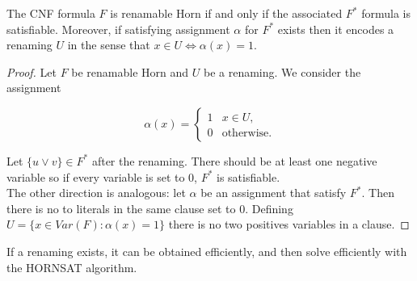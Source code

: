 \begin{theorem}
  The CNF formula $F$ is renamable Horn if and only if the associated $F^*$ formula is satisfiable. Moreover, if satisfying assignment $\alpha$ for $F^*$  exists then it encodes a renaming $U$ in the sense that $x \in U \iff \alpha(x) = 1$.
\end{theorem}
\begin{proof}
  Let $F$ be renamable Horn and $U$ be a renaming. We consider the assignment

$$
\alpha(x)= 
\begin{cases}
1 & x \in U,\\
0 & \text{otherwise}.
\end{cases}
$$
 
  Let $\{u\vee v\} \in F^*$ after the renaming. There should be at least one negative variable so if every variable is set to 0, $F^*$ is satisfiable.\\

  The other direction is analogous: let $\alpha$ be an assignment that satisfy $F^*$. Then there is no to literals in the same clause set to 0. Defining $U=  \{x \in Var(F) : \alpha(x) = 1\}$ there is no two positives variables in a clause.
  \end{proof}


If a renaming exists, it can be obtained efficiently, and then solve efficiently with the HORNSAT algorithm.






